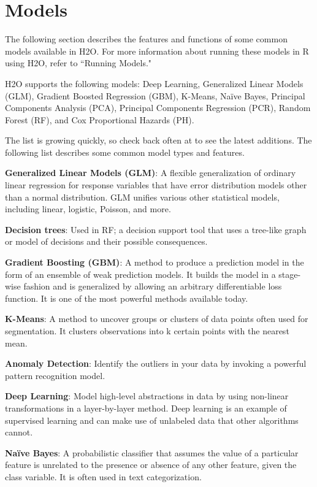 \documentclass[11pt]{article}
\begin{document}
\section{Models}

The following section describes the features and functions of some common models available in H2O.  For more information about running these models in R using H2O, refer to ``Running Models." 

H2O supports the following models: Deep Learning, Generalized Linear Models (GLM), Gradient Boosted Regression (GBM), K-Means, Na\"{i}ve Bayes, Principal Components Analysis (PCA), Principal Components Regression (PCR), Random Forest (RF), and Cox Proportional Hazards (PH). 

The list is growing quickly, so check back often at  to see the latest additions. The following list describes some common model types and features. 

{\textbf{Generalized Linear Models (GLM)}}: A flexible generalization of ordinary linear regression for response variables that have error distribution models other than a normal distribution. GLM unifies various other statistical models, including linear, logistic, Poisson, and more.

{\textbf{Decision trees}}: Used in RF; a decision support tool that uses a tree-like graph or model of decisions and their possible consequences.

{\textbf{Gradient Boosting (GBM)}}: A method to produce a prediction model in the form of an ensemble of weak prediction models. It builds the model in a stage-wise fashion and is generalized by allowing an arbitrary differentiable loss function. It is one of the most powerful methods available today.

{\textbf{K-Means}}: A method to uncover groups or clusters of data points often used for segmentation. It clusters observations into k certain points with the nearest mean.

{\textbf{Anomaly Detection}}: Identify the outliers in your data by invoking a powerful pattern recognition model.

{\textbf{Deep Learning}}: Model high-level abstractions in data by using non-linear transformations in a layer-by-layer method. Deep learning is an example of supervised learning and can make use of unlabeled data that other algorithms cannot.

{\textbf{Na\"{i}ve Bayes}}: A probabilistic classifier that assumes the value of a particular feature is unrelated to the presence or absence of any other feature, given the class variable. It is often used in text categorization.
\end{document}
